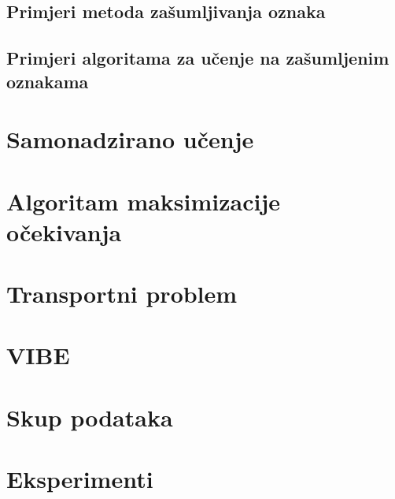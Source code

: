 \documentclass[diplomskirad]{fer}
\begin{document}
\section{Primjeri metoda zašumljivanja oznaka}
\label{sek:primjeri_zasumljivanja}

\section{Primjeri algoritama za učenje na zašumljenim oznakama}
\label{sek:primjeri_obrana_zasumljivanje}
\chapter{Samonadzirano učenje}
\label{pog:samonadzirano}


\chapter{Algoritam maksimizacije očekivanja}
\label{pog:em_algoritam}


\chapter{Transportni problem}
\label{pog:transport}


\chapter{VIBE}
\label{pog:vibe}


\chapter{Skup podataka}
\label{pog:skup}


\chapter{Eksperimenti}
\label{pog:eksperimenti}


\end{document}
